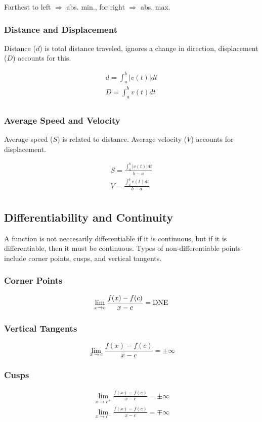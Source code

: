 Farthest to left $\Rightarrow$ abs. min., for right $\Rightarrow$ abs. max.

\subsubsection{Distance and Displacement}

Distance ($d$) is total distance traveled, ignores a change in direction,
displacement ($D$) accounts for this.

\begin{gather*}
    d=\int_{a}^{b}|v(t)|dt\\
    D=\int_{a}^{b}v(t)dt\\
\end{gather*}

\subsubsection{Average Speed and Velocity}

Average speed ($S$) is related to distance.
Average velocity ($V$) accounts for displacement.

\begin{gather*}
    S=\frac{\int_{a}^{b}|v(t)|dt}{b-a}\\
    V=\frac{\int_{a}^{b}v(t)dt}{b-a}\\
\end{gather*}

\subsection{Differentiability and Continuity}\label{subsec:differentiability-and-continuity}

A function is not neccesarily differentiable if it is continuous, but if it 
is differentiable, then it must be continuous.
Types of non-differentiable
points include corner points, cusps, and vertical tangents.

\subsubsection{Corner Points}

\[\lim_{x\to{c}}\frac{f(x)-f(c)}{x-c}=\operatorname{DNE}\]

\subsubsection{Vertical Tangents}

\[\lim_{x\to{c}}\frac{f(x)-f(c)}{x-c}=\pm \infty\]

\subsubsection{Cusps}

\begin{gather*}
    \lim_{x\to{c^+}}\frac{f(x)-f(c)}{x-c}=\pm \infty\\
    \lim_{x\to{c^-}}\frac{f(x)-f(c)}{x-c}=\mp \infty\\
\end{gather*}